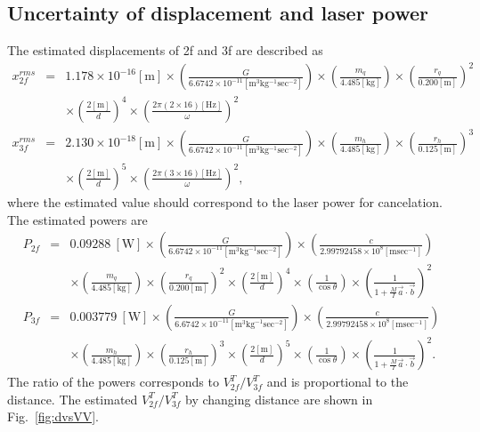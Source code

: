 \documentclass[A4]{spie}  %
\begin{document}
\subsection{Uncertainty of displacement and  laser power}
 The estimated displacements of 2f and 3f are described as
\begin{eqnarray}
x^{rms}_{2f}&=&1.178 \times 10^{-16}\mathrm{[m]} \times \left( \frac{G}{6.6742 \times 10^{-11} \mathrm{[m^3kg^{-1}sec^{-2}]}} \right) \times \left( \frac{m_q}{4.485 \mathrm{[kg]}} \right) \times \left( \frac{r_q}{0.200 \mathrm{[m]}} \right)^2 \\
 &&\times \left( \frac{2\mathrm{[m]}}{d} \right)^4 \times \left( \frac{2\pi(2\times 16)\mathrm{[Hz]}}{\omega} \right)^2\\
x^{rms}_{3f}&=&2.130 \times 10^{-18}\mathrm{[m]} \times \left( \frac{G}{6.6742 \times 10^{-11} \mathrm{[m^3kg^{-1}sec^{-2}]}} \right) \times \left( \frac{m_h}{4.485 \mathrm{[kg]}} \right) \times \left( \frac{r_h}{0.125 \mathrm{[m]}} \right)^3 \\
 &&\times \left( \frac{2\mathrm{[m]}}{d} \right)^5 \times \left( \frac{2\pi(3\times 16)\mathrm{[Hz]}}{\omega} \right)^2,
\end{eqnarray}
where the estimated value should correspond to the laser power for cancelation. 
The estimated powers are
\begin{eqnarray}
P_{2f}&=&0.09288 ~\mathrm{[W]}\times \left( \frac{G}{6.6742 \times 10^{-11} \mathrm{[m^3kg^{-1}sec^{-2}]}} \right)\times \left( \frac{c}{2.99792458 \times 10^{8} \mathrm{[m sec^{-1}]}} \right)\\
&& \times \left( \frac{m_q}{4.485 \mathrm{[kg]}} \right) \times \left( \frac{r_q}{0.200 \mathrm{[m]}} \right)^2 \times \left( \frac{2\mathrm{[m]}}{d} \right)^4 \times \left( \frac{1}{\cos{\theta}} \right) \times \left( \frac{1}{1+\frac{M}{I}\vec{a}\cdot \vec{b}} \right)^2\\
P_{3f}&=&0.003779~\mathrm{[W]} \times \left( \frac{G}{6.6742 \times 10^{-11} \mathrm{[m^3kg^{-1}sec^{-2}]}} \right)\times \left( \frac{c}{2.99792458 \times 10^{8} \mathrm{[m sec^{-1}]}} \right)\\
&& \times \left( \frac{m_h}{4.485 \mathrm{[kg]}} \right) \times \left( \frac{r_h}{0.125 \mathrm{[m]}} \right)^3 \times \left( \frac{2\mathrm{[m]}}{d} \right)^5 \times \left( \frac{1}{\cos{\theta}} \right) \times \left( \frac{1}{1+\frac{M}{I}\vec{a}\cdot \vec{b}} \right)^2.
\end{eqnarray}
The ratio of the powers corresponds to $V^T_{2f}/V^{T}_{3f}$ and is proportional to the distance. The estimated $V^T_{2f}/V^{T}_{3f}$ by changing distance are shown in Fig.~\ref{fig:dvsVV}.
\end{document}
